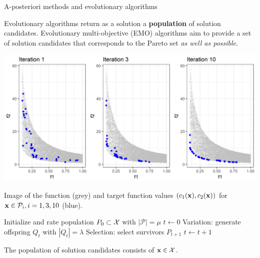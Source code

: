 \begin{frame}[allowframebreaks]{A-posteriori methods and evolutionary algorithms}

Evolutionary algorithms return as a solution a \textbf{population} of solution candidates. Evolutionary multi-objective (EMO) algorithms aim to provide a set of solution candidates that corresponds to the Pareto set \textit{as well as possible}.

\vspace*{-0.4cm}

\begin{center}
\includegraphics[width = 0.7\linewidth]{images/EA-steps.png}
\end{center}

\vspace*{-0.4cm}

\begin{footnotesize}
Image of the function (grey) and target function values $(c_1(\mathbf{x}), c_2(\mathbf{x}))$ for $\mathbf{x} \in \mathcal{P}_i, i = 1, 3, 10$ (blue).
\end{footnotesize}

\framebreak
\begin{algorithm}[H]
  \begin{center}
  \caption{Evolutionary algorithm}
      \begin{algorithmic}[1]
      \STATE Initialize and rate population $P_0 \subset \mathcal{X}$ with $|\mathcal{P}| = \mu$ %
      \STATE $t \leftarrow 0$
      \REPEAT
        \STATE Variation: generate offspring $Q_t$ with $|Q_t| = \lambda$
        \STATE Selection: select survivors $P_{t + 1}$ %
 		\STATE $t \leftarrow t + 1$
     \end{algorithmic}
    \end{center}
\end{algorithm}

The population of solution candidates consists of $\mathbf{x} \in \mathcal{X}$. %

\end{frame}


